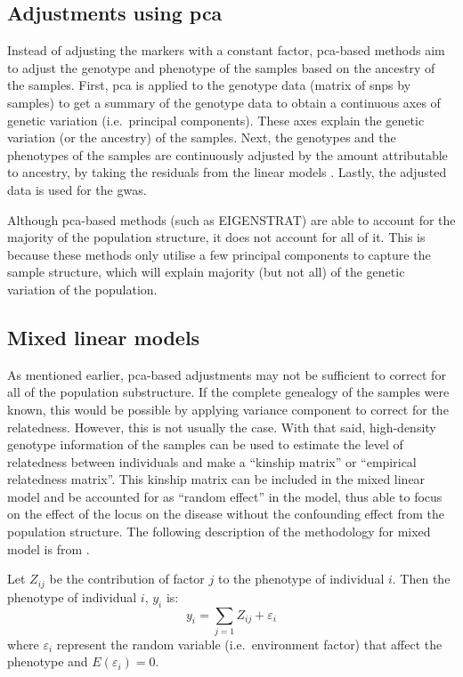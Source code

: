 \subsection{Adjustments using \gls{pca}}
\label{sub:adjustments_using_pca}

Instead of adjusting the markers with a constant factor, \gls{pca}-based methods aim to adjust the genotype and phenotype of the samples based on the ancestry of the samples.
First, \gls{pca} is applied to the genotype data (matrix of \glspl{snp} by samples) to get  a summary of the genotype data to obtain a continuous axes of genetic variation (i.e.\ principal components).
These axes explain the genetic variation (or the ancestry) of the samples.
Next, the genotypes and  the phenotypes of the samples are continuously adjusted by the amount attributable to ancestry, by taking the residuals from the linear models \citep{Price2006}.
Lastly, the adjusted data is used for the \gls{gwas}.

Although \gls{pca}-based methods (such as EIGENSTRAT) are able to account for the majority of the population structure, it does not account for all of it.
This is because these methods only utilise a few principal components to capture the sample structure, which will explain majority (but not all) of the genetic variation of the population.

\subsection{Mixed linear models}
\label{sub:mixed_linear_models}

As mentioned earlier, \gls{pca}-based adjustments may not be sufficient to correct for all of the population substructure.
If the complete genealogy of the samples were known, this would be possible by applying variance component to correct for the relatedness.
However, this is not usually the case.
With that said, high-density genotype information of the samples can be  used to estimate the level of relatedness between individuals and make a ``kinship matrix'' or ``empirical relatedness matrix''.
This kinship matrix can be included in the mixed linear model and be accounted for as ``random effect'' in the model, thus able to focus on the effect of the locus on the disease without the confounding effect from the population structure.
The following description of the methodology for mixed model is from \citet{Kang2010}.

Let $Z_{ij}$ be the contribution of factor $j$ to the phenotype of individual $i$.
Then the phenotype of individual $i$, $y_i$ is:
\begin{equation*}
	y_i = \sum_{j=1} Z_{ij} + \varepsilon_i
\end{equation*}
where $\varepsilon_i$ represent the random variable (i.e.\ environment factor) that affect the phenotype and $E(\varepsilon_i) = 0$.

